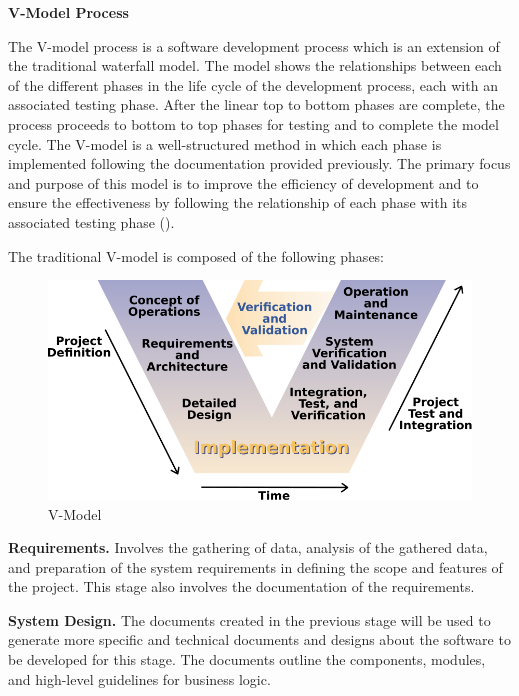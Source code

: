 \flushleft
\textbf{V-Model Process}\\
\justifying

\parx
The V-model process is a software development process which is an extension of
the traditional waterfall model. The model shows the relationships between each
of the different phases in the life cycle of the development process, each with
an associated testing phase. After the linear top to bottom phases are complete,
the process proceeds to bottom to top phases for testing and to complete the
model cycle. The V-model is a well-structured method in which each phase is
implemented following the documentation provided previously. The primary focus
and purpose of this model is to improve the efficiency of development and to
ensure the effectiveness by following the relationship of each phase with its
associated testing phase (\cite{rook_1986}).

\parx
The traditional V-model is composed of the following phases:

\begin{figure}[H]
	\includegraphics[width=\linewidth]{figures/v_model.png}
	\caption{V-Model}
	\label{fig:v_model}
\end{figure}

\parx
\textbf{Requirements.}
\justifying
Involves the gathering of data, analysis of the gathered data, and preparation
of the system requirements in defining the scope and features of the project.
This stage also involves the documentation of the requirements.

\parx
\textbf{System Design.}
\justifying
The documents created in the previous stage will be used to generate more
specific and technical documents and designs about the software to be developed
for this stage. The documents outline the components, modules, and high-level
guidelines for business logic.

